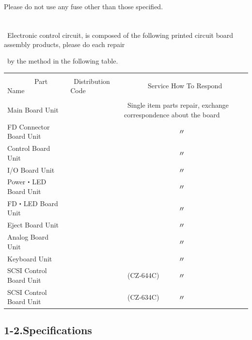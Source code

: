 \documentclass[twoside,a4paper,12pt]{article}
\begin{document}
Please do not use any fuse other than those specified.\\\\

\ \\[-3mm]

\scriptsize \ Electronic control circuit, is composed of the following printed circuit board assembly products, please do each repair

 \ by the method in the following table.\\[-2mm]

\small

\setlength{\arrayrulewidth}{0.5mm}
\setlength{\tabcolsep}{2mm}
\begin{tabular}{|p{55mm}|p{40mm}|p{62mm}|}
\hline
& & \\[-2mm]
\ \ \ \ \ \ \ \ Part Name & \ Distribution Code & \ \ \ \ \ \ \ Service How To Respond\\
\hline
& & \\[-4mm]
Main Board Unit & & \ Single item parts repair, exchange correspondence about the board\\
FD Connector Board Unit & & \ \ \ \ \ \ \ \ \ \ \ \ \ \ \ \ 〃\\
Control Board Unit & & \ \ \ \ \ \ \ \ \ \ \ \ \ \ \ \ 〃\\
I/O Board Unit & & \ \ \ \ \ \ \ \ \ \ \ \ \ \ \ \ 〃\\
Power・LED Board Unit & & \ \ \ \ \ \ \ \ \ \ \ \ \ \ \ \ 〃\\
FD・LED Board Unit & & \ \ \ \ \ \ \ \ \ \ \ \ \ \ \ \ 〃\\
Eject Board Unit & & \ \ \ \ \ \ \ \ \ \ \ \ \ \ \ \ 〃\\
Analog Board Unit & & \ \ \ \ \ \ \ \ \ \ \ \ \ \ \ \ 〃\\
Keyboard Unit & & \ \ \ \ \ \ \ \ \ \ \ \ \ \ \ \ 〃\\
SCSI Control Board Unit & & \ (CZ-644C) \ \ \ \ \ 〃\\
SCSI Control Board Unit & & \ (CZ-634C) \ \ \ \ \ 〃\\[4mm]
\hline
\end{tabular}

\newpage

\subsection*{1-2.Specifications}
\end{document}
